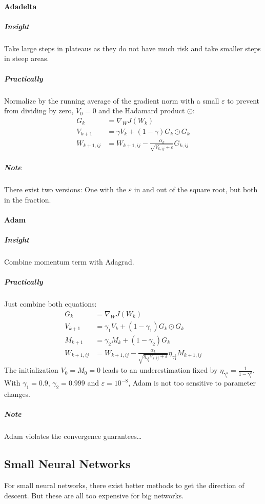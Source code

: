 			\paragraph{Adadelta}
				\subparagraph{Insight}
				Take large steps in plateaus as they do not have much risk and take smaller steps in steep areas.
				
				\subparagraph{Practically}
				Normalize by the running average of the gradient norm with a small \(\varepsilon\) to prevent from dividing by zero, \( V_0 = 0 \) and the Hadamard product \( \odot \):
				\begin{align}
					G_k &= \nabla_W J(W_k) \\
					V_{k + 1} &= \gamma V_k + (1 - \gamma) G_k \odot G_k \\
					W_{k + 1, ij} &= W_{k + 1, ij} - \frac{\alpha_k}{\sqrt{V_{k, ij} + \varepsilon}} G_{k, ij}
				\end{align}
				
				\subparagraph{Note}
				There exist two versions: One with the \(\varepsilon\) in and out of the square root, but both in the fraction.

			\paragraph{Adam}
				\subparagraph{Insight}
				Combine momentum term with Adagrad.
				
				\subparagraph{Practically}
				Just combine both equations:
				\begin{align}
					G_k &= \nabla_W J(W_k) \\
					V_{k + 1} &= \gamma_1 V_k + (1 - \gamma_1) G_k \odot G_k \\
					M_{k + 1} &= \gamma_2 M_k + (1 - \gamma_2) G_k \\
					W_{k + 1, ij} &= W_{k + 1, ij} - \frac{\alpha_k}{\sqrt{\eta_{\gamma_1^k} V_{k, ij} + \varepsilon}} \eta_{\gamma_1^k} M_{k + 1, ij}
				\end{align}
				The initialization \( V_0 = M_0 = 0 \) leads to an underestimation fixed by \( \eta_{\gamma_i^k} = \frac{1}{1 - \gamma_i^k} \). With \( \gamma_1 = 0.9 \), \( \gamma_2 = 0.999 \) and \( \varepsilon = 10^{-8} \), Adam is not too sensitive to parameter changes.
				
				\subparagraph{Note}
				Adam violates the convergence guarantees\dots

		\subsection{Small Neural Networks}
			For small neural networks, there exist better methods to get the direction of descent. But these are all too expensive for big networks.

